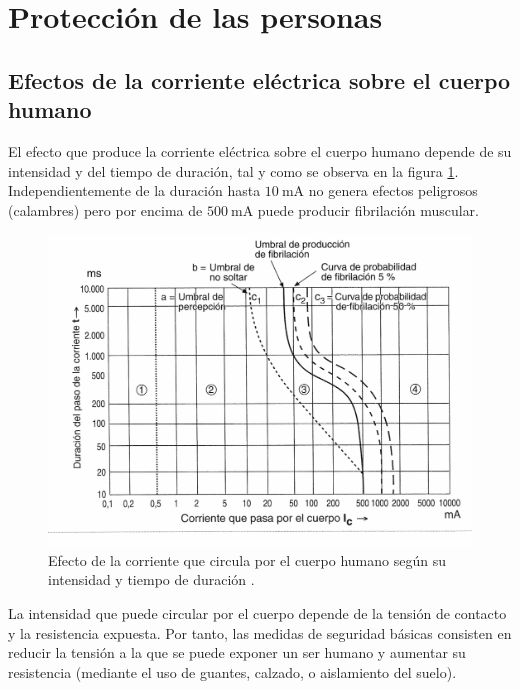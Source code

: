 \section{Protección de las personas}


\subsection{Efectos de la corriente eléctrica sobre el cuerpo humano}

El efecto que produce la corriente eléctrica sobre el cuerpo humano
depende de su intensidad y del tiempo de duración, tal y como se observa
en la figura \ref{fig:EfectoCorriente}. Independientemente de la
duración hasta $\SI{10}{\milli\ampere}$ no genera efectos peligrosos
(calambres) pero por encima de $\SI{500}{\milli\ampere}$ puede producir
fibrilación muscular.

%
\begin{figure}
\includegraphics[scale=0.23]{../figs/CurvaIntensidadContactoTiempo}

\caption[Efecto de la corriente que circula por el cuerpo humano]{Efecto de la corriente que circula por el cuerpo humano según su
intensidad y tiempo de duración \cite{PerezGabarda2000,PerezGabarda2000a}.\label{fig:EfectoCorriente}}

\end{figure}


La intensidad que puede circular por el cuerpo depende de la tensión
de contacto y la resistencia expuesta. Por tanto, las medidas de seguridad
básicas consisten en reducir la tensión a la que se puede exponer
un ser humano y aumentar su resistencia (mediante el uso de guantes,
calzado, o aislamiento del suelo). 


